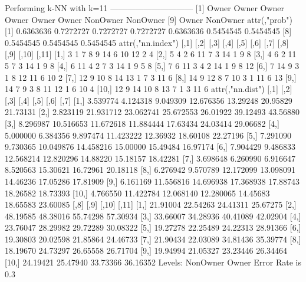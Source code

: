 \documentclass{article}
\begin{document}
\begin{Schunk}
\begin{Soutput}
Performing k-NN with k=11
 ------------------------------
 [1] Owner    Owner    Owner    Owner    Owner    Owner    NonOwner NonOwner
 [9] Owner    NonOwner
attr(,"prob")
 [1] 0.6363636 0.7272727 0.7272727 0.7272727 0.6363636 0.5454545 0.5454545
 [8] 0.5454545 0.5454545 0.5454545
attr(,"nn.index")
      [,1] [,2] [,3] [,4] [,5] [,6] [,7] [,8] [,9] [,10] [,11]
 [1,]    3    1    7    8    9   14    6   10   12     2     4
 [2,]    5    4    2    6   11    7    3   14    1     9     8
 [3,]    4    6    2   11    5    7    3   14    1     9     8
 [4,]    6   11    4    2    7    3   14    1    9     5     8
 [5,]    7    6   11    3    4    2   14    1    9     8    12
 [6,]    7   14    9    3    1    8   12   11    6    10     2
 [7,]   12    9   10    8   14   13    1    7    3    11     6
 [8,]   14    9   12    8    7   10    3    1   11     6    13
 [9,]   14    7    9    3    8   11   12    1    6    10     4
[10,]   12    9   14   10    8   13    7    1    3    11     6
attr(,"nn.dist")
          [,1]      [,2]      [,3]      [,4]     [,5]     [,6]     [,7]
 [1,] 3.539774  4.124318  9.049309 12.676356 13.29248 20.95829 21.73131
 [2,] 2.823119 21.931712 23.062741 25.672553 26.01922 39.12493 43.56880
 [3,] 8.296987 10.516653 11.672618 11.884444 17.63434 24.03414 29.06682
 [4,] 5.000000  6.384356  9.897474 11.423222 12.36932 18.60108 22.27196
 [5,] 7.291090  9.730365 10.049876 14.458216 15.00000 15.49484 16.97174
 [6,] 7.904429  9.486833 12.568214 12.820296 14.88220 15.18157 18.42281
 [7,] 3.698648  6.260990  6.916647  8.520563 15.30621 16.72961 20.18118
 [8,] 6.276942  9.570789 12.172099 13.098091 14.46236 17.05286 17.81909
 [9,] 6.161169 11.556816 14.696938 17.368938 17.88743 18.26582 18.73393
[10,] 4.766550 11.422784 12.068140 12.280065 14.45683 18.65583 23.60085
          [,8]     [,9]    [,10]    [,11]
 [1,] 21.91004 22.54263 24.41311 25.67275
 [2,] 48.19585 48.38016 55.74298 57.30934
 [3,] 33.66007 34.28936 40.41089 42.02904
 [4,] 23.76047 28.29982 29.72289 30.08322
 [5,] 19.27278 22.25489 24.22313 28.91366
 [6,] 19.30803 20.02598 21.85864 24.46733
 [7,] 21.90434 22.03089 34.81436 35.39774
 [8,] 18.19670 24.73297 26.65558 26.71704
 [9,] 19.94994 21.05327 23.23446 26.34464
[10,] 24.19421 25.47940 33.73366 36.16352
Levels: NonOwner Owner
Error Rate is  0.3


\end{Soutput}
\end{Schunk}
\end{document}
